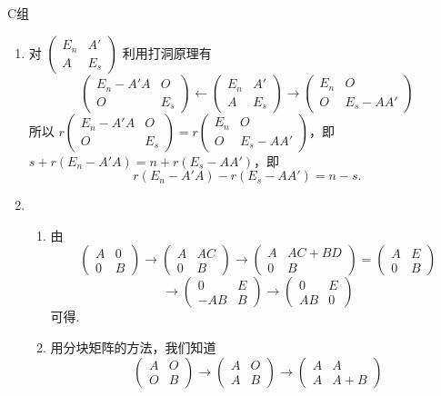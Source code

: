\centerline{\heiti C组}
\begin{enumerate}
    \item 对 $\begin{pmatrix}E_n & A' \\ A & E_s\end{pmatrix}$ 利用打洞原理有
    \[\begin{pmatrix}E_n-A'A & O \\ O & E_s\end{pmatrix} \leftarrow \begin{pmatrix}E_n & A' \\ A & E_s\end{pmatrix} \rightarrow \begin{pmatrix}E_n & O \\ O & E_s-AA'\end{pmatrix}\]
    所以 $r\begin{pmatrix}E_n-A'A & O \\ O & E_s\end{pmatrix}=r\begin{pmatrix}E_n & O \\ O & E_s-AA'\end{pmatrix}$，即 $s+r(E_n-A'A)=n+r(E_s-AA')$，即
    \[r(E_n-A'A)-r(E_s-AA')=n-s.\]
    \item \begin{enumerate}
        \item 由 \[\begin{pmatrix}A & 0 \\ 0 & B\end{pmatrix}\rightarrow \begin{pmatrix}A & AC \\ 0 & B\end{pmatrix}\rightarrow \begin{pmatrix}A & AC+BD \\ 0 & B\end{pmatrix}=\begin{pmatrix}A & E \\ 0 & B\end{pmatrix}\]
        \[\rightarrow \begin{pmatrix}0 & E \\ -AB & B\end{pmatrix}\rightarrow \begin{pmatrix}0 & E \\ AB & 0\end{pmatrix}\]
        可得.
    \item 用分块矩阵的方法，我们知道 
    \[\begin{pmatrix}A & O \\ O & B\end{pmatrix}\rightarrow \begin{pmatrix}A & O \\ A & B\end{pmatrix}\rightarrow \begin{pmatrix}A & A \\ A & A+B\end{pmatrix}\]

\end{enumerate}
\end{enumerate}
